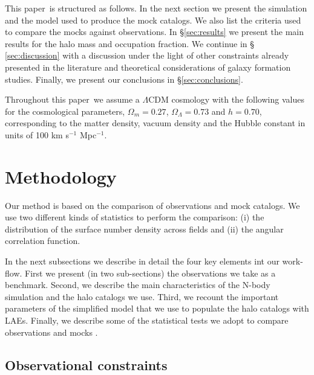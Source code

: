 \documentclass[usenatbib]{mn2e}
\newcommand{\documentname}{paper~}
\begin{document}
This \documentname is structured as follows. In the next section we present
the simulation and the model used to produce the mock catalogs. We
also list the criteria used to compare the mocks against
observations. In \S \ref{sec:results} we present the main results for
the halo mass and occupation fraction. We continue in \S
\ref{sec:discussion} with a discussion under the light of other
constraints already presented in the literature and theoretical
considerations of galaxy formation studies. Finally, we present our
conclusions in \S \ref{sec:conclusions}.   

Throughout this \documentname we assume a $\Lambda$CDM cosmology with the
following values for the cosmological parameters, $\Omega_{m}=0.27$,
$\Omega_{\Lambda}=0.73$ and $h=0.70$, corresponding to the matter
density, vacuum density and the Hubble constant in units of 100 km
s$^{-1}$ Mpc$^{-1}$. 

\section{Methodology}


Our method is based on the comparison of observations and mock
catalogs. We use two different kinds of statistics to perform the
comparison: (i) the distribution of the surface number density
across fields and (ii) the angular correlation function.

In the next subsections we describe in detail the four key
elements int our work-flow. First we present (in two sub-sections) the
observations we take as a benchmark. Second, we describe the main
characteristics of the N-body simulation and the halo catalogs we
use. Third, we recount the important parameters of the simplified
model that we use to populate the halo catalogs with LAEs. Finally, we
describe some of the statistical tests we adopt to compare
observations and mocks .

\subsection{Observational constraints}
\end{document}
